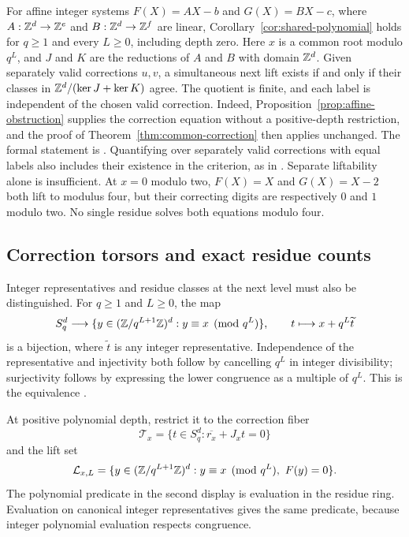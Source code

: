 For affine integer systems $F(X)=AX-b$ and $G(X)=BX-c$, where
$A:\mathbb Z^d\to\mathbb Z^e$ and $B:\mathbb Z^d\to\mathbb Z^f$ are linear,
Corollary~\ref{cor:shared-polynomial} holds for $q\ge1$ and every
$L\ge0$, including depth zero. Here $x$ is a common root modulo $q^L$,
and $J$ and $K$ are the reductions of $A$ and $B$ with domain $\mathbb Z^d$.
Given separately valid corrections $u,v$, a simultaneous next lift exists
if and only if their classes in $\mathbb Z^d/(\ker J+\ker K)$ agree. The quotient
is finite, and each label is independent of the chosen valid correction.
Indeed, Proposition~\ref{prop:affine-obstruction} supplies the correction
equation without a positive-depth restriction, and the proof of
Theorem~\ref{thm:common-correction} then applies unchanged. The formal
statement is .
Quantifying over separately valid corrections with equal labels also
includes their existence in the criterion, as in
.
Separate liftability alone is insufficient. At $x=0$ modulo two,
$F(X)=X$ and $G(X)=X-2$ both lift to modulus four, but their correcting
digits are respectively $0$ and $1$ modulo two. No single residue solves
both equations modulo four.

\subsection{Correction torsors and exact residue counts}

Integer representatives and residue classes at the next level must also be
distinguished. For $q\ge1$ and $L\ge0$, the map
\[
 S_q^d\longrightarrow
 \{y\in(\mathbb Z/q^{L+1}\mathbb Z)^d:y\equiv x\pmod{q^L}\},
 \qquad t\longmapsto x+q^L\widetilde t
\]
is a bijection, where $\widetilde t$ is any integer representative.
Independence of the representative and injectivity both follow by cancelling
$q^L$ in integer divisibility; surjectivity follows by expressing the lower
congruence as a multiple of $q^L$. This is the equivalence
.

At positive polynomial depth, restrict it to the correction fiber
\[
 \mathcal T_x=\{t\in S_q^d:\overline{r_x}+J_xt=0\}
\]
and the lift set
\[
 \mathcal L_{x,L}=
 \{y\in(\mathbb Z/q^{L+1}\mathbb Z)^d:y\equiv x\pmod{q^L},\ F(y)=0\}.
\]
The polynomial predicate in the second display is evaluation in the residue
ring. Evaluation on canonical integer representatives gives the same
predicate, because integer polynomial evaluation respects congruence.

